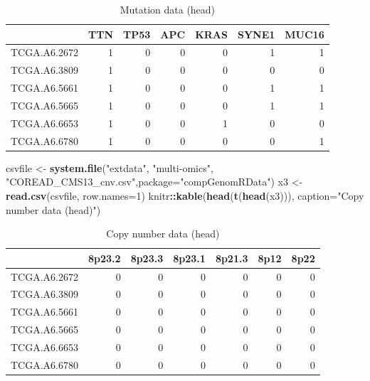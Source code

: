 \documentclass[12pt,]{krantz}
\newenvironment{Shaded}{\begin{snugshade}}{\end{snugshade}}
\newcommand{\DataTypeTok}[1]{\textcolor[rgb]{0.13,0.29,0.53}{#1}}
\newcommand{\DecValTok}[1]{\textcolor[rgb]{0.00,0.00,0.81}{#1}}
\newcommand{\KeywordTok}[1]{\textcolor[rgb]{0.13,0.29,0.53}{\textbf{#1}}}
\newcommand{\NormalTok}[1]{#1}
\newcommand{\OperatorTok}[1]{\textcolor[rgb]{0.81,0.36,0.00}{\textbf{#1}}}
\newcommand{\StringTok}[1]{\textcolor[rgb]{0.31,0.60,0.02}{#1}}
\begin{document}
\begin{table}[t]

\caption{\label{tab:moloadMultiomicsMUT}Mutation data (head)}
\centering
\begin{tabular}{l|r|r|r|r|r|r}
\hline
  & TTN & TP53 & APC & KRAS & SYNE1 & MUC16\\
\hline
TCGA.A6.2672 & 1 & 0 & 0 & 0 & 1 & 1\\
\hline
TCGA.A6.3809 & 1 & 0 & 0 & 0 & 0 & 0\\
\hline
TCGA.A6.5661 & 1 & 0 & 0 & 0 & 1 & 1\\
\hline
TCGA.A6.5665 & 1 & 0 & 0 & 0 & 1 & 1\\
\hline
TCGA.A6.6653 & 1 & 0 & 0 & 1 & 0 & 0\\
\hline
TCGA.A6.6780 & 1 & 0 & 0 & 0 & 0 & 1\\
\hline
\end{tabular}
\end{table}

\begin{Shaded}
\begin{Highlighting}[]
\NormalTok{csvfile <-}\StringTok{ }\KeywordTok{system.file}\NormalTok{(}\StringTok{"extdata"}\NormalTok{, }\StringTok{"multi-omics"}\NormalTok{, }\StringTok{"COREAD_CMS13_cnv.csv"}\NormalTok{,}\DataTypeTok{package=}\StringTok{"compGenomRData"}\NormalTok{)}
\NormalTok{x3 <-}\StringTok{ }\KeywordTok{read.csv}\NormalTok{(csvfile, }\DataTypeTok{row.names=}\DecValTok{1}\NormalTok{)}
\NormalTok{knitr}\OperatorTok{::}\KeywordTok{kable}\NormalTok{(}\KeywordTok{head}\NormalTok{(}\KeywordTok{t}\NormalTok{(}\KeywordTok{head}\NormalTok{(x3))), }\DataTypeTok{caption=}\StringTok{"Copy number data (head)"}\NormalTok{)}
\end{Highlighting}
\end{Shaded}

\begin{table}[t]

\caption{\label{tab:moloadMultiomicsCNV}Copy number data (head)}
\centering
\begin{tabular}{l|r|r|r|r|r|r}
\hline
  & 8p23.2 & 8p23.3 & 8p23.1 & 8p21.3 & 8p12 & 8p22\\
\hline
TCGA.A6.2672 & 0 & 0 & 0 & 0 & 0 & 0\\
\hline
TCGA.A6.3809 & 0 & 0 & 0 & 0 & 0 & 0\\
\hline
TCGA.A6.5661 & 0 & 0 & 0 & 0 & 0 & 0\\
\hline
TCGA.A6.5665 & 0 & 0 & 0 & 0 & 0 & 0\\
\hline
TCGA.A6.6653 & 0 & 0 & 0 & 0 & 0 & 0\\
\hline
TCGA.A6.6780 & 0 & 0 & 0 & 0 & 0 & 0\\
\hline
\end{tabular}
\end{table}
\end{document}
